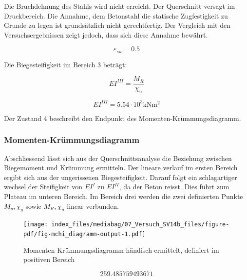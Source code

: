 \documentclass[
  letterpaper,
]{scrreprt}
\begin{document}
Die Bruchdehnung des Stahls wird nicht erreicht. Der Querschnitt versagt
im Druckbereich. Die Annahme, dem Betonstahl die statische Zugfestigkeit
zu Grunde zu legen ist grundsätzlich nicht gerechtfertig. Der Vergleich
mit den Versuchsergebnissen zeigt jedoch, dass sich diese Annahme
bewährt.

\begin{equation}\varepsilon_{su} = 0.5\end{equation}

Die Biegesteifigkeit im Bereich 3 beträgt:

\begin{equation}EI^{III} = \frac{M_{R}}{\chi_{u}}\end{equation}

\begin{equation}EI^{III} = 5.54 \cdot 10^{3} \text{kN} \text{m}^{2}\end{equation}

Der Zustand 4 beschreibt den Endpunkt des Momenten-Krümmungsdiagramm.

\hypertarget{momenten-kruxfcmmungsdiagramm-2}{%
\subsubsection{Momenten-Krümmungsdiagramm}\label{momenten-kruxfcmmungsdiagramm-2}}

Abschliessend lässt sich aus der Querschnittsanalyse die Beziehung
zwischen Biegemoment und Krümmung ermitteln. Der lineare verlauf im
ersten Bereich ergibt sich aus der ungerissenen Biegesteifigkeit. Darauf
folgt ein schlagartiger wechsel der Steifigkeit von \(EI^I\) zu
\(EI^{II}\), da der Beton reisst. Dies führt zum Plateau im unteren
Bereich. Im Bereich drei werden die zwei definierten Punkte
\(M_y, \chi_y\) sowie \(M_R, \chi_u\) linear verbunden.

\begin{figure}[H]

{\centering \texttt{[image: index\_files/mediabag/07\_Versuch\_SV14b\_files/figure-pdf/fig-mchi\_diagramm-output-1.pdf]}

}

\caption{\label{fig-mchi_diagramm}Momenten-Krümmungsdiagramm händisch
ermittelt, definiert im positiven Bereich}

\end{figure}

\begin{equation}259.485759493671\end{equation}
\end{document}
